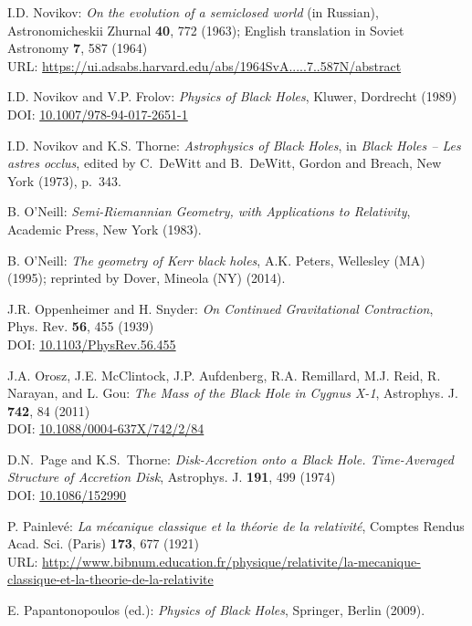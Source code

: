 \begin{thebibliography}{123}
I.D. Novikov:
{\em On the evolution of a semiclosed world} (in Russian),
Astronomicheskii Zhurnal {\bf 40}, 772 (1963); English translation in
Soviet Astronomy {\bf 7}, 587 (1964)\\
URL: \url{https://ui.adsabs.harvard.edu/abs/1964SvA.....7..587N/abstract}

I.D. Novikov and V.P. Frolov: {\em Physics of Black Holes},
Kluwer, Dordrecht (1989)\\
DOI: \href{https://doi.org/10.1007/978-94-017-2651-1}{10.1007/978-94-017-2651-1}

I.D. Novikov and K.S. Thorne: {\em Astrophysics of Black Holes},
in {\em Black Holes -- Les astres occlus},  edited by C.~DeWitt and B.~DeWitt,
Gordon and Breach, New York (1973), p.~343.

B. O'Neill: {\em Semi-Riemannian Geometry, with Applications to Relativity},
Academic Press, New York (1983).

B. O'Neill: {\em The geometry of Kerr black holes}, A.K. Peters, Wellesley (MA) (1995);
reprinted by Dover, Mineola (NY) (2014).

J.R. Oppenheimer and H. Snyder:
{\em On Continued Gravitational Contraction},
Phys. Rev. {\bf 56}, 455 (1939)\\
DOI: \href{https://doi.org/10.1103/PhysRev.56.455}{10.1103/PhysRev.56.455}

J.A. Orosz, J.E. McClintock, J.P. Aufdenberg, R.A. Remillard, M.J. Reid, R. Narayan, and L. Gou:
{\em The Mass of the Black Hole in Cygnus X-1},
Astrophys. J. {\bf 742}, 84 (2011)\\
DOI: \href{https://doi.org/10.1088/0004-637X/742/2/84}{10.1088/0004-637X/742/2/84}

D.N.~Page and K.S.~Thorne: \emph{Disk-Accretion onto a Black Hole. Time-Averaged Structure of Accretion Disk},
Astrophys. J. {\bf 191}, 499 (1974)\\
DOI: \href{https://doi.org/10.1086/152990}{10.1086/152990}

P. Painlevé: \emph{La mécanique classique et la théorie de la relativité},
Comptes Rendus Acad. Sci. (Paris) {\bf 173}, 677 (1921)\\
URL: \url{http://www.bibnum.education.fr/physique/relativite/la-mecanique-classique-et-la-theorie-de-la-relativite}

E. Papantonopoulos (ed.): {\em Physics of Black Holes}, Springer, Berlin (2009).


\end{thebibliography}
